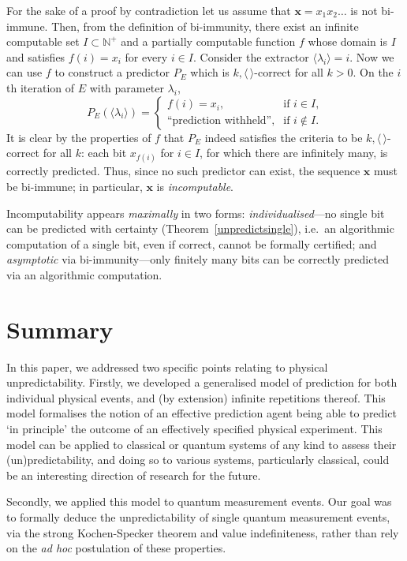 \documentclass[%
 superscriptaddress,
 preprint,
 showpacs,
 showkeys,
 preprintnumbers,
  amsmath,amssymb,
  aps,
 pra,
  longbibliography,
  floatfix,
 ]{revtex4-1}
\theoremstyle{definition}
\newcommand{\N}{\mathbb{N}}%
\newcommand{\x}{\mathbf{x}}
\begin{document}
For the sake of a proof by contradiction let us assume that $\x=x_1x_2\dots$ is not bi-immune. 
Then, from the definition of bi-immunity, there exist an infinite computable set $I \subset \N^+$ and a partially computable function $f$ whose domain is $I$ and satisfies $f(i)=x_i$ for every $i\in I$.
Consider the extractor $\langle \lambda_i\rangle = i$.
Now we can use $f$ to construct a predictor $P_E$ which is $k,\langle \, \rangle$-correct for all $k>0$. 
On the $i$th iteration of $E$ with parameter $\lambda_i$, $$P_E(\langle\lambda_i\rangle)=\begin{cases}f(i)=x_i, & \text{if $i\in I$,}\\\text{``{prediction withheld}'',} & \text{if $i\notin I$.}\end{cases}$$
It is clear by the properties of $f$ that $P_E$ indeed satisfies the criteria to be $k,\langle \, \rangle$-correct for all $k$:
each bit $x_{f(i)}$ for $i\in I$, for which there are infinitely many, is correctly predicted.
Thus, since no such predictor can exist, the sequence $\x$ must be bi-immune; in particular,   $\x$ is {\em incomputable}.

Incomputability appears {\em maximally} in two forms: {\em individualised}---no single bit can be predicted with certainty (Theorem~\ref{unpredictsingle}), i.e.\  an algorithmic computation
of a single bit, even if correct, cannot be formally certified; and {\em asymptotic} via  bi-immunity---only finitely many bits can be correctly predicted via an algorithmic computation.
 
\section{Summary}

In this paper, we addressed two specific points relating to physical unpredictability.
Firstly, we developed a generalised model of prediction for both individual physical events, and (by extension) infinite repetitions thereof.
This model formalises the notion of an effective prediction agent being able to predict `in principle' the outcome of an effectively specified physical experiment.
This model can be applied to classical or quantum systems of any kind to assess their (un)predictability, and doing so to various systems, particularly classical, could be an interesting direction of research for the future.

Secondly, we  applied this model to quantum measurement events.
Our goal was to formally deduce the unpredictability of single quantum measurement events, via the strong Kochen-Specker theorem and value indefiniteness, rather than rely on the \emph{ad hoc} postulation of these properties.
\end{document}
